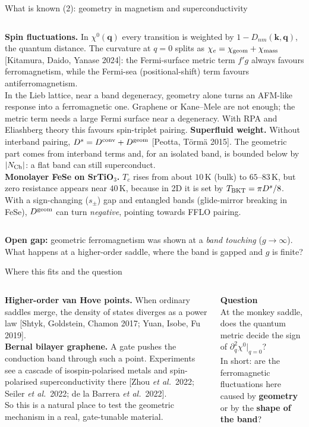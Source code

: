 \documentclass[aspectratio=169,11pt]{beamer}
\newcommand{\keybox}[1]{%
  \begin{center}\colorbox{boxbg}{\parbox{0.94\linewidth}{\vskip3pt\centering #1\vskip3pt}}\end{center}}
\newcommand{\bk}{\mathbf{k}}
\newcommand{\bq}{\mathbf{q}}
\newcommand{\chie}{\chi_{e}}
\newcommand{\chig}{\chi_{\rm geom}}
\newcommand{\chim}{\chi_{\rm mass}}
\begin{document}
\begin{frame}{What is known (2): geometry in magnetism and superconductivity}
\begin{columns}[T]
\footnotesize
\textbf{Spin fluctuations.} In $\chi^0(\bq)$ every transition is weighted by $1-D_{nm}(\bk,\bq)$, the
quantum distance. The curvature at $q=0$ splits as $\chie=\chig+\chim$
{\color{muted}\tiny[Kitamura, Daido, Yanase 2024]}:
the Fermi-surface metric term $f'g$ always favours ferromagnetism, while the Fermi-sea
(positional-shift) term favours antiferromagnetism.\\[2pt]
In the Lieb lattice, near a band degeneracy, geometry alone turns an AFM-like
response into a ferromagnetic one. Graphene or Kane--Mele are not enough; the metric term needs a
large Fermi surface near a degeneracy. With RPA and Eliashberg theory this favours spin-triplet pairing.
\footnotesize
\textbf{Superfluid weight.} Without interband pairing, $D^s=D^{\rm conv}+D^{\rm geom}$
{\color{muted}\tiny[Peotta, T\"orm\"a 2015]}. The geometric part comes from interband terms and, for an
isolated band, is bounded below by $|N_{\rm Ch}|$: a flat band can still superconduct.\\[3pt]
\textbf{Monolayer FeSe on SrTiO$_3$.} $T_c$ rises from about $10$\,K (bulk) to $65$--$83$\,K, but zero resistance
appears near $40$\,K, because in 2D it is set by $T_{\rm BKT}=\pi D^s/8$.
With a sign-changing ($s_{\pm}$) gap and entangled bands (glide-mirror breaking in FeSe),
$D^{\rm geom}$ can turn \emph{negative}, pointing towards FFLO pairing.
\end{columns}
\vskip2pt
\keybox{\footnotesize\textbf{Open gap:} geometric ferromagnetism was shown at a \emph{band touching} ($g\to\infty$).
What happens at a higher-order saddle, where the band is gapped and $g$ is finite?}
\end{frame}

\begin{frame}{Where this fits and the question}
\begin{columns}[T]
\small
\textbf{Higher-order van Hove points.}
When ordinary saddles merge, the density of states diverges as a power law
{\color{muted}\scriptsize[Shtyk, Goldstein, Chamon 2017; Yuan, Isobe, Fu 2019]}.\\[6pt]
\textbf{Bernal bilayer graphene.}
A gate pushes the conduction band through such a point. Experiments see a cascade of
isospin-polarised metals and spin-polarised superconductivity there
{\color{muted}\scriptsize[Zhou \emph{et al.}\ 2022; Seiler \emph{et al.}\ 2022; de la Barrera \emph{et al.}\ 2022]}.\\[6pt]
So this is a natural place to test the geometric mechanism in a real, gate-tunable material.
\vskip10pt
\keybox{\small\textbf{Question}\\[4pt]
At the monkey saddle, does the quantum metric decide the sign of $\partial_q^2\chi^0|_{q=0}$?\\[4pt]
In short: are the ferromagnetic fluctuations here caused by \textbf{geometry}
or by the \textbf{shape of the band}?}
\end{columns}
\end{frame}
\end{document}
